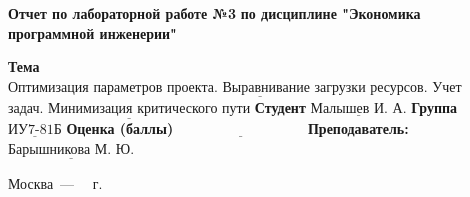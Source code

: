 \documentclass[12pt]{report}
\begin{document}
\begin{titlepage}
		
		\begin{center}
			\noindent\begin{minipage}{1.3\textwidth}\centering
				\Large\textbf{  Отчет по лабораторной работе №3}\newline
				\textbf{по дисциплине \newline "Экономика программной инженерии"}\newline\newline
			\end{minipage}
		\end{center}
		
		\noindent\textbf{Тема} $\underline{\text{Оптимизация параметров проекта. Выравнивание загрузки ресурсов. Учет периодических}}$\newline\newline
		\indent\indent $\underline{\text{задач. Минимизация критического пути}}$\newline\newline
		\noindent\textbf{Студент} $\underline{\text{Малышев И. А.}}$\newline\newline
		\noindent\textbf{Группа} $\underline{\text{ИУ7-81Б}}$\newline\newline
		\noindent\textbf{Оценка (баллы)} $\underline{\text{~~~~~~~~~~~~~~~~~~~~~~~~~~~}}$\newline\newline
		\noindent\textbf{Преподаватель: } $\underline{\text{Барышникова М. Ю.}}$\newline\newline\newline
		
		\begin{center}
			\vfill
			Москва~---~\the\year
			~г.
		\end{center}
	\end{titlepage}
	
	\setcounter{page}{2}
	
	
	
	
	
\end{document}
